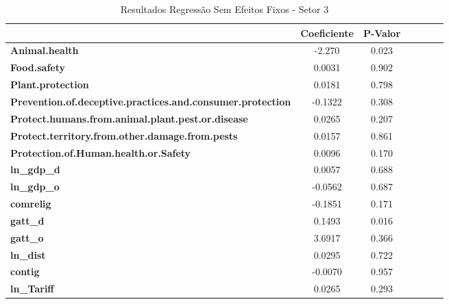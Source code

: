
\begin{table}[ht!]
    \begin{center}
        \begin{tabular}{lcccccc}
            & \textbf{Coeficiente} &\textbf{P-Valor}\\
            \midrule
            \textbf{Animal.health}                                 & -2.270       &  0.023  \\
\textbf{Food.safety}                                               &       0.0031  &  0.902  \\
\textbf{Plant.protection}                                          &       0.0181  &  0.798  \\
\textbf{Prevention.of.deceptive.practices.and.consumer.protection} &      -0.1322  &  0.308  \\
\textbf{Protect.humans.from.animal.plant.pest.or.disease}          &       0.0265  &  0.207  \\
\textbf{Protect.territory.from.other.damage.from.pests}            &       0.0157  &  0.861  \\
\textbf{Protection.of.Human.health.or.Safety}                      &       0.0096  &  0.170  \\
\textbf{ln\_gdp\_d}                                                &       0.0057  &  0.688  \\
\textbf{ln\_gdp\_o}                                                &      -0.0562  &  0.687  \\
\textbf{comrelig}                                                  &      -0.1851  &  0.171  \\
\textbf{gatt\_d}                                                   &       0.1493  &  0.016  \\
\textbf{gatt\_o}                                                   &       3.6917  &  0.366  \\
\textbf{ln\_dist}                                                  &       0.0295  &  0.722  \\
\textbf{contig}                                                    &      -0.0070  &  0.957  \\
\textbf{ln\_Tariff}                                                &       0.0265  &  0.293  \\
\bottomrule
\end{tabular}
\caption{Resultados Regressão Sem Efeitos Fixos - Setor 3}
\end{center}
\end{table}
